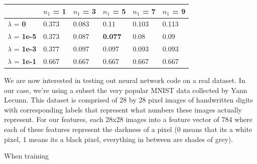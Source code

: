 \documentclass[10pt]{article}
\begin{document}
\begin{table}
\centering
\begin{tabular}{llllll}
\toprule
& $n_1$ = \bf{1} & $n_1$ =  \bf{3} & $n_1$ =  \bf{5} & $n_1$ =  \bf{7} & $n_1$ =  \bf{9} \\
\midrule
$\lambda$ = \bf{0} &        0.373 & 0.083 & 0.11  & 0.103 & 0.113 \\
$\lambda$ = \bf{1e-5} &    0.373 & 0.087 & \bf{0.077} & 0.08  & 0.09  \\
$\lambda$ = \bf{1e-3} &    0.377 & 0.097 & 0.097 & 0.093 & 0.093 \\
$\lambda$ = \bf{1e-1} &    0.667 & 0.667 & 0.667 & 0.667 & 0.667 \\
\bottomrule
\end{tabular}
\end{table}

We are now interested in testing out neural network code on a real dataset. In our case, we're using a subset the very popular MNIST data collected by Yann Lecunn. This dataset is comprised of 28 by 28 pixel images of handwritten digits with corresponding labels that represent what numbers these images actually represent. For our features, each 28x28 images into a feature vector of 784 where each of these features represent the darkness of a pixel (0 means that its a white pixel, 1 means its a black pixel, everything in between are shades of grey).

When training 


	
\end{document}
